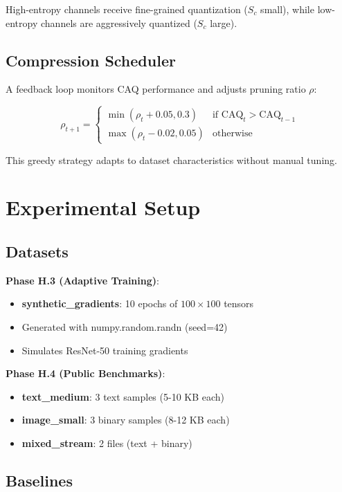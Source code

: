 \documentclass[11pt,twocolumn]{article}
\begin{document}
High-entropy channels receive fine-grained quantization ($S_c$ small), while low-entropy channels are aggressively quantized ($S_c$ large).

\subsection{Compression Scheduler}

A feedback loop monitors CAQ performance and adjusts pruning ratio $\rho$:

\begin{equation}
\rho_{t+1} = \begin{cases}
\min(\rho_t + 0.05, 0.3) & \text{if } \text{CAQ}_t > \text{CAQ}_{t-1} \\
\max(\rho_t - 0.02, 0.05) & \text{otherwise}
\end{cases}
\end{equation}

This greedy strategy adapts to dataset characteristics without manual tuning.

\section{Experimental Setup}

\subsection{Datasets}

\textbf{Phase H.3 (Adaptive Training)}:
\begin{itemize}
    \item \textbf{synthetic\_gradients}: 10 epochs of $100 \times 100$ tensors
    \item Generated with numpy.random.randn (seed=42)
    \item Simulates ResNet-50 training gradients
\end{itemize}

\textbf{Phase H.4 (Public Benchmarks)}:
\begin{itemize}
    \item \textbf{text\_medium}: 3 text samples (5-10 KB each)
    \item \textbf{image\_small}: 3 binary samples (8-12 KB each)
    \item \textbf{mixed\_stream}: 2 files (text + binary)
\end{itemize}

\subsection{Baselines}
\end{document}

